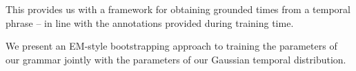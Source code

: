 This provides us with a framework for obtaining grounded times from a
	temporal phrase -- in line with the annotations provided during training
	time.


We present an EM-style bootstrapping approach to training the 
	parameters of our grammar jointly with the parameters of our 
	Gaussian temporal distribution.



